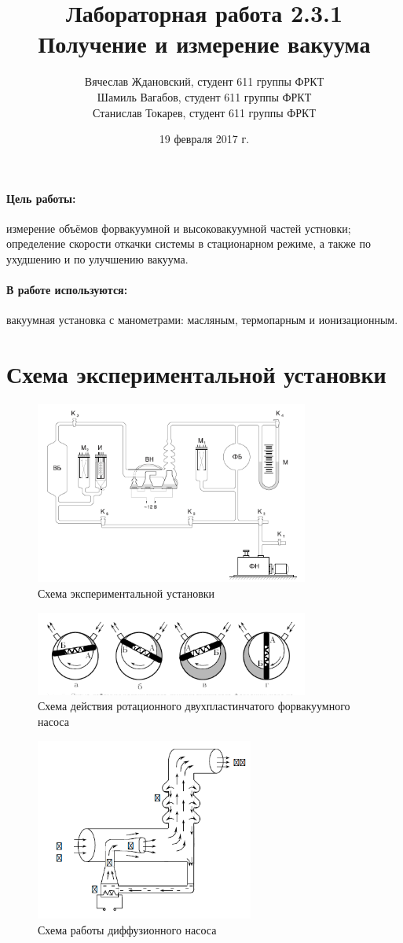 \documentclass[a4paper]{article}
\title{Лабораторная работа 2.3.1 \\Получение и измерение вакуума}
\date{19 февраля 2017 г.}
\author{Вячеслав Ждановский, студент 611 группы ФРКТ\\
Шамиль Вагабов, студент 611 группы ФРКТ\\
Станислав Токарев, студент 611 группы ФРКТ}
\begin{document}
	\maketitle
	\newpage
	\paragraph{Цель работы:}
	измерение объёмов форвакуумной и высоковакуумной частей устновки; определение скорости откачки системы в стационарном режиме, а также по ухудшению и по улучшению вакуума.
	\paragraph{В работе используются:}
	вакуумная установка с манометрами: масляным, термопарным и ионизационным.
	\section{Схема экспериментальной установки}
	\begin{figure}[h!]
		\centering
		\includegraphics[width=90mm]{pic.png}
		\caption{Схема экспериментальной установки \label{overflow}}
	\end{figure}
	\begin{figure}[h!]
		\centering
		\includegraphics[width=90mm]{pic1.png}
		\caption{Схема действия ротационного двухпластинчатого форвакуумного насоса\label{overflow}}
	\end{figure}
	\begin{figure}[h!]
		\centering
		\includegraphics[height=60mm]{pic2.png}
		\caption{Схема работы диффузионного насоса \label{overflow}}
		\end{figure}
\end{document}

